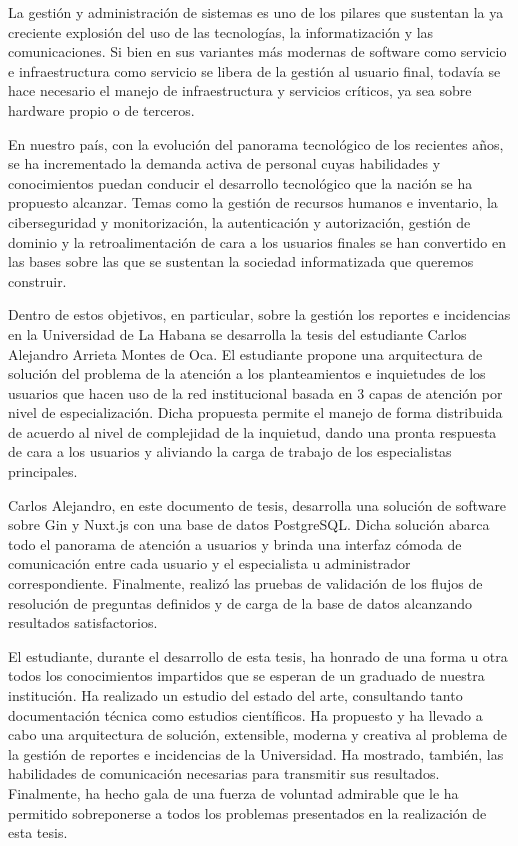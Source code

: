\begin{opinion}
    La gestión y administración de sistemas es uno de los pilares que sustentan la ya creciente explosión del uso de las tecnologías, la informatización y las comunicaciones. Si bien en sus variantes más modernas de software como servicio e infraestructura como servicio se libera de la gestión al usuario final, todavía se hace necesario el manejo de infraestructura y servicios críticos, ya sea sobre hardware propio o de terceros.
\newline
    
    En nuestro país, con la evolución del panorama tecnológico de los recientes años, se ha incrementado la demanda activa de personal cuyas habilidades y conocimientos puedan conducir el desarrollo tecnológico que la nación se ha propuesto alcanzar. Temas como la gestión de recursos humanos e inventario, la ciberseguridad y monitorización, la autenticación y autorización, gestión de dominio y la retroalimentación de cara a los usuarios finales se han convertido en las bases sobre las que se sustentan la sociedad informatizada que queremos construir. 
    \newline
    
    Dentro de estos objetivos, en particular, sobre la gestión los reportes e incidencias en la Universidad de La Habana se desarrolla la tesis del estudiante Carlos Alejandro Arrieta Montes de Oca. El estudiante propone una arquitectura de solución del problema de la atención a los planteamientos e inquietudes de los usuarios que hacen uso de la red institucional basada en 3 capas de atención por nivel de especialización. Dicha propuesta permite el manejo de forma distribuida de acuerdo al nivel de complejidad de la inquietud, dando una pronta respuesta de cara a los usuarios y aliviando la carga de trabajo de los especialistas principales.
    \newline
    
    Carlos Alejandro, en este documento de tesis, desarrolla una solución de software sobre Gin y Nuxt.js con una base de datos PostgreSQL. Dicha solución abarca todo el panorama de atención a usuarios y brinda una interfaz cómoda de comunicación entre cada usuario y el especialista u administrador correspondiente. Finalmente, realizó las pruebas de validación de los flujos de resolución de preguntas definidos y de carga de la base de datos alcanzando resultados satisfactorios.
    \newline
    
    El estudiante, durante el desarrollo de esta tesis, ha honrado de una forma u otra todos los conocimientos impartidos que se esperan de un graduado de nuestra institución. Ha realizado un estudio del estado del arte, consultando tanto documentación técnica como estudios científicos. Ha propuesto y ha llevado a cabo una arquitectura de solución, extensible, moderna y creativa al problema de la gestión de reportes e incidencias de la Universidad. Ha mostrado, también, las habilidades de comunicación necesarias para transmitir sus resultados. Finalmente, ha hecho gala de una fuerza de voluntad admirable que le ha permitido sobreponerse a todos los problemas presentados en la realización de esta tesis. 
    \newline
    

\end{opinion}

